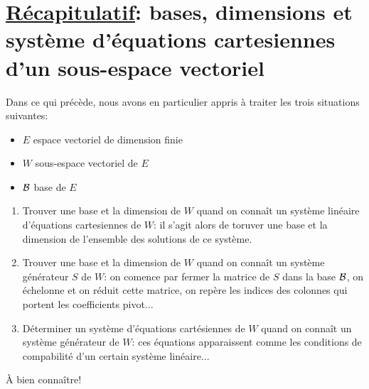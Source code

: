 
%
%
\section[Récapitulatif]{\underline{Récapitulatif}: bases, dimensions et système d'équations cartesiennes d'un sous-espace vectoriel}
%
%
Dans ce qui précède, nous avons en particulier appris à traiter les trois situations suivantes:
\begin{itemize}
  \item $E$ espace vectoriel de dimension finie
  \item $W$ sous-espace vectoriel de $E$
  \item $\mathcal{B}$ base de $E$
\end{itemize}

\begin{enumerate}
  \item Trouver une base et la dimension de $W$ quand on  connaît un système linéaire d'équations cartesiennes de $W$: il s'agit alors de toruver une base et la dimension de l'ensemble des solutions de ce système.
  \item Trouver une base et la dimension de $W$ quand on connaît un système générateur $S$ de $W$: on comence par fermer la matrice de $S$ dans la base $\mathcal{B}$, on échelonne et on réduit cette matrice, on repère les indices des colonnes qui portent les coefficients pivot...
  \item Déterminer un système d'équations cartésiennes de $W$ quand on connaît un système générateur de $W$: ces équations apparaissent comme les conditions de compabilité d'un certain système linéaire...
\end{enumerate}
À bien connaître!
